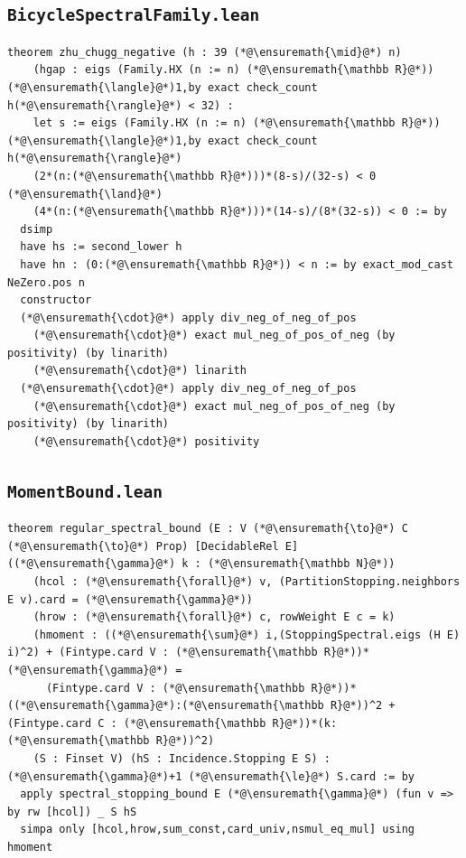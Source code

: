 \subsection*{\texttt{BicycleSpectralFamily.lean}}
\begin{lstlisting}
theorem zhu_chugg_negative (h : 39 (*@\ensuremath{\mid}@*) n)
    (hgap : eigs (Family.HX (n := n) (*@\ensuremath{\mathbb R}@*)) (*@\ensuremath{\langle}@*)1,by exact check_count h(*@\ensuremath{\rangle}@*) < 32) :
    let s := eigs (Family.HX (n := n) (*@\ensuremath{\mathbb R}@*)) (*@\ensuremath{\langle}@*)1,by exact check_count h(*@\ensuremath{\rangle}@*)
    (2*(n:(*@\ensuremath{\mathbb R}@*)))*(8-s)/(32-s) < 0 (*@\ensuremath{\land}@*)
    (4*(n:(*@\ensuremath{\mathbb R}@*)))*(14-s)/(8*(32-s)) < 0 := by
  dsimp
  have hs := second_lower h
  have hn : (0:(*@\ensuremath{\mathbb R}@*)) < n := by exact_mod_cast NeZero.pos n
  constructor
  (*@\ensuremath{\cdot}@*) apply div_neg_of_neg_of_pos
    (*@\ensuremath{\cdot}@*) exact mul_neg_of_pos_of_neg (by positivity) (by linarith)
    (*@\ensuremath{\cdot}@*) linarith
  (*@\ensuremath{\cdot}@*) apply div_neg_of_neg_of_pos
    (*@\ensuremath{\cdot}@*) exact mul_neg_of_pos_of_neg (by positivity) (by linarith)
    (*@\ensuremath{\cdot}@*) positivity
\end{lstlisting}
\subsection*{\texttt{MomentBound.lean}}
\begin{lstlisting}
theorem regular_spectral_bound (E : V (*@\ensuremath{\to}@*) C (*@\ensuremath{\to}@*) Prop) [DecidableRel E] ((*@\ensuremath{\gamma}@*) k : (*@\ensuremath{\mathbb N}@*))
    (hcol : (*@\ensuremath{\forall}@*) v, (PartitionStopping.neighbors E v).card = (*@\ensuremath{\gamma}@*))
    (hrow : (*@\ensuremath{\forall}@*) c, rowWeight E c = k)
    (hmoment : ((*@\ensuremath{\sum}@*) i,(StoppingSpectral.eigs (H E) i)^2) + (Fintype.card V : (*@\ensuremath{\mathbb R}@*))*(*@\ensuremath{\gamma}@*) =
      (Fintype.card V : (*@\ensuremath{\mathbb R}@*))*((*@\ensuremath{\gamma}@*):(*@\ensuremath{\mathbb R}@*))^2 + (Fintype.card C : (*@\ensuremath{\mathbb R}@*))*(k:(*@\ensuremath{\mathbb R}@*))^2)
    (S : Finset V) (hS : Incidence.Stopping E S) : (*@\ensuremath{\gamma}@*)+1 (*@\ensuremath{\le}@*) S.card := by
  apply spectral_stopping_bound E (*@\ensuremath{\gamma}@*) (fun v => by rw [hcol]) _ S hS
  simpa only [hcol,hrow,sum_const,card_univ,nsmul_eq_mul] using hmoment
\end{lstlisting}
